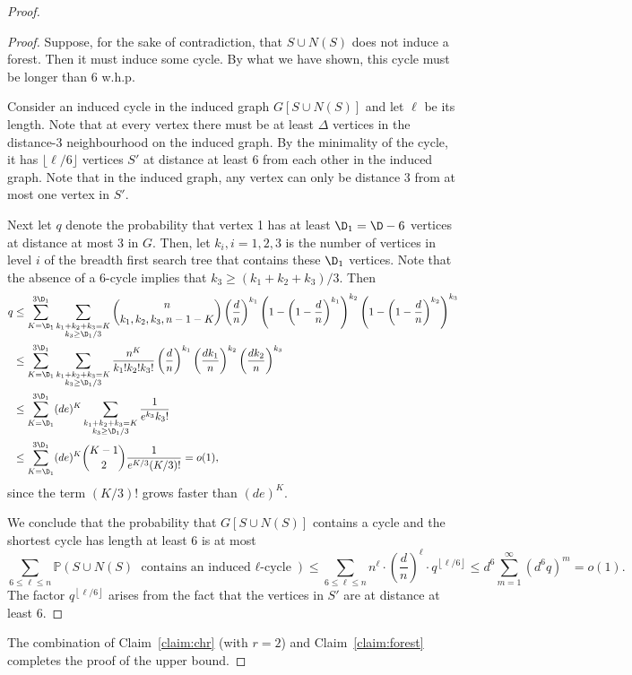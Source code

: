 \documentclass[12pt,a4paper]{article}
\newcommand{\rdown}[1]{{\left\lfloor #1\right \rfloor}}
\newcommand{\brac}[1]{\left(#1\right)}
\newcommand{\bfrac}[2]{\left(\frac{#1}{#2}\right)}
\theoremstyle{plain}
\begin{document}
\begin{proof}
\begin{proof}
Suppose, for the sake of contradiction, that $S \cup N(S)$ does not induce a forest. Then it must induce some cycle. By what we have shown, this cycle must be longer than $6$ w.h.p.

Consider an induced cycle in the induced graph $G[S \cup N(S)]$ and let $\ell$ be its length. Note that at every vertex there must be at least $\Delta$ vertices in the distance-3 neighbourhood on the induced graph. By the minimality of the cycle, it has $\lfloor \ell/ 6 \rfloor$ vertices $S'$ at distance at least 6 from each other in the induced graph. Note that in the induced graph, any vertex can only be distance 3 from at most one vertex in $S'$.

Next let $q$ denote the probability that vertex 1 has at least $\D_1=\D-6$ vertices at distance at most 3 in $G$. Then, let $k_i,i=1,2,3$ is the number of vertices in level $i$ of the breadth first search tree that contains these $\D_1$ vertices. Note that the absence of a 6-cycle implies that $k_3\geq (k_1+k_2+k_3)/3$. Then
\begin{align*}
q
&\leq \sum_{K=\D_1}^{3\D_1}\sum_{\substack{k_1+k_2+k_3=K\\k_3\geq \D_1/3}}\binom{n}{k_1,k_2,k_3,n-1-K}\bfrac{d}{n}^{k_1}\brac{1-\brac{1-\frac{d}{n}}^{k_1}}^{k_2}\brac{1-\brac{1-\frac{d}{n}}^{k_2}}^{k_3}\\
&\leq \sum_{K=\D_1}^{3\D_1}\sum_{\substack{k_1+k_2+k_3=K\\k_3\geq \D_1/3}}\frac{n^K}{k_1!k_2!k_3!}\bfrac{d}{n}^{k_1}\bfrac{dk_1}{n}^{k_2}\bfrac{dk_2}{n}^{k_3}\\
&\leq \sum_{K=\D_1}^{3\D_1}(de)^K\sum_{\substack{k_1+k_2+k_3=K\\k_3\geq \D_1/3}}\frac{1}{e^{k_3}k_3!}\\
&\leq \sum_{K=\D_1}^{3\D_1}(de)^K\binom{K-1}{2}\frac{1}{e^{K/3}(K/3)!}=o(1),
\end{align*}
since the term $(K/3)!$ grows faster than $(de)^K$.

We conclude that the probability that $G[S \cup N(S)]$ contains a cycle and the shortest cycle has length at least 6 is at most
\[
\sum_{6 \leq \ell \leq n} \mathbb{P}(S \cup N(S) \text{ contains an induced $\ell$-cycle})\leq \sum_{6 \leq \ell \leq n} n^{\ell} \cdot \bfrac{d}{n}^{\ell} \cdot q^{\rdown{\ell/6}}\leq d^6\sum_{m=1}^\infty(d^6q)^m=o(1).
\]
The factor $q^{\rdown{\ell/6}}$ arises from the fact that the vertices in $S'$ are at distance at least 6.
\end{proof}
The combination of Claim~\ref{claim:chr} (with $r=2$) and Claim~\ref{claim:forest} completes the proof of the upper bound.
\end{proof}
\end{document}
